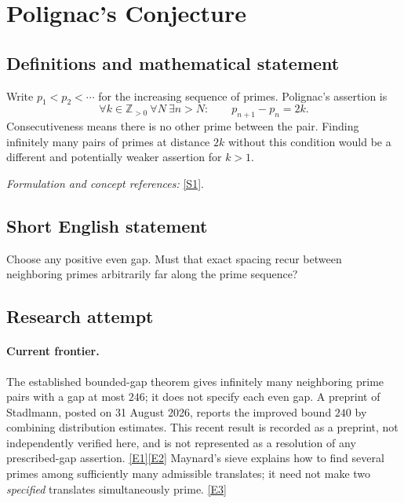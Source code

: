 \documentclass[11pt,a4paper]{article}
\newcommand{\Z}{\mathbb{Z}}
\newcommand{\sref}[2]{\hyperlink{source:#1:#2}{[S#2]}}
\newcommand{\eref}[2]{\hyperlink{extra:#1:#2}{[E#2]}}
\newif\ifshowcatalogue
\newcommand{\cataloguescope}[1]{\ifshowcatalogue
 \paragraph{Exact scope in the supplied catalogue.}
 \begin{quote}\small #1\end{quote}\fi}
\numberwithin{equation}{section}
\begin{document}
\setcounter{section}{0}
\clearpage
\section*{\texorpdfstring{Polignac's Conjecture}{Polignac's Conjecture}}\label{1153}
\subsection{Definitions and mathematical statement}
Write $p_1<p_2<\cdots$ for the increasing sequence of primes. Polignac's assertion is
\[
 \forall k\in\Z_{>0}\ \forall N\ \exists n>N:\qquad p_{n+1}-p_n=2k.
\]
Consecutiveness means there is no other prime between the pair. Finding infinitely many pairs of primes at distance $2k$ without this condition would be a different and potentially weaker assertion for $k>1$.
\par\smallskip\textit{Formulation and concept references:} \sref{1153}{1}.
\cataloguescope{For every positive even integer 2k, there are infinitely many pairs of consecutive primes whose difference is 2k.}
\subsection{Short English statement}
Choose any positive even gap. Must that exact spacing recur between neighboring primes arbitrarily far along the prime sequence?
\subsection{Research attempt}

\paragraph{Current frontier.}
The established bounded-gap theorem gives infinitely many neighboring prime
pairs with a gap at most $246$; it does not specify each even gap. A preprint
of Stadlmann, posted on 31 August 2026, reports the improved bound $240$ by
combining distribution estimates. This recent result is recorded as a
preprint, not independently verified here, and is not represented as a
resolution of any prescribed-gap assertion. \eref{1153}{1}\eref{1153}{2}
Maynard's sieve explains how to find several primes among sufficiently many
admissible translates; it need not make two \emph{specified} translates
simultaneously prime. \eref{1153}{3}
\end{document}
